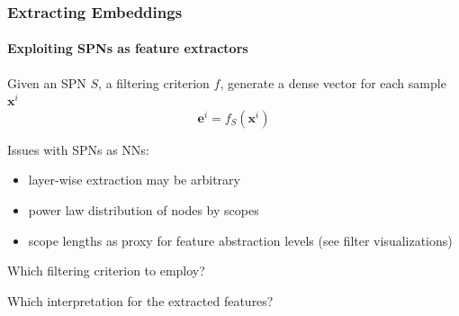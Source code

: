 \documentclass[10pt, t, xcolor={usenames,dvipsnames,svgnames}, compress]{beamer}
\begin{document}
\begin{frame}
  \frametitle{Extracting Embeddings}
  \framesubtitle{Exploiting SPNs as feature extractors}

  Given an SPN $S$, a filtering criterion $f$, generate a dense vector
  for each sample $\mathbf{x}^{i}$
  $$\mathbf{e}^{i} =f_{S}(\mathbf{x}^{i})$$
  
  Issues with SPNs as NNs:
  \begin{itemize}
  \item layer-wise extraction may be arbitrary
  \item power law distribution of nodes by scopes
    \item scope lengths as proxy for feature abstraction levels (see filter visualizations)
    \end{itemize}

    Which filtering criterion to employ?\par
    Which interpretation for the extracted features?
  
\end{frame}
\end{document}
